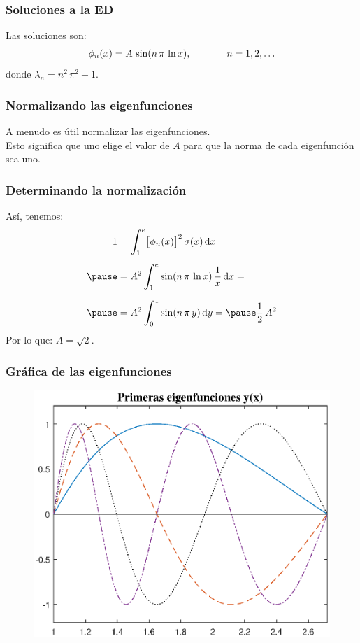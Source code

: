\documentclass[12pt]{beamer}
\begin{document}
\begin{frame}
\frametitle{Soluciones a la ED}
Las soluciones son:
\pause
\begin{align*}
\phi_{n} (x) = A \, \sin (n \, \pi \, \ln x), \hspace{1.3cm} n = 1, 2, \ldots
\end{align*}
donde $\lambda_{n} = n^{2} \, \pi^{2} - 1$.
\end{frame}
\begin{frame}
\frametitle{Normalizando las eigenfunciones}
A menudo es útil normalizar las eigenfunciones.
\\
\bigskip
\pause
Esto significa que uno elige el valor de $A$ para que la norma de cada eigenfunción sea uno.
\end{frame}
\begin{frame}
\frametitle{Determinando la normalización}
Así, tenemos:
\pause
\begin{eqnarray}
\begin{aligned}[b]
1 &= \scaleint{6ex}_{\bs 1}^{e} \big[ \phi_{n} (x) \big]^{2} \, \sigma (x) \dd{x} = \\[0.5em] \pause
&= A^{2} \, \scaleint{6ex}_{\bs 1}^{e} \sin (n \, \pi \, \ln x) \, \dfrac{1}{x} \dd{x} = \\[0.5em] \pause
&= A^{2} \, \scaleint{6ex}_{\bs 0}^{1} \sin (n \, \pi \, y) \dd{y} = \pause \dfrac{1}{2} \, A^{2}
\end{aligned}
\label{eq:ecuacion_04_27}
\end{eqnarray}
Por lo que: $A = \sqrt{2}$.
\end{frame}
\begin{frame}
\frametitle{Gráfica de las eigenfunciones}
\begin{figure}[H]
    \centering
    \includegraphics[scale=0.6]{Imagenes/Expansion_Eigenfunciones_01.eps}
\end{figure}
\end{frame}
\end{document}
